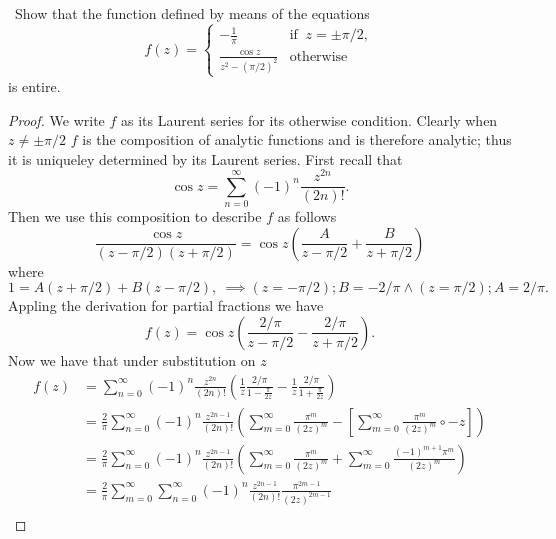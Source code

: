 \documentclass[11pt]{amsart}
\theoremstyle{definition}
\numberwithin{theorem}{section}
\numberwithin{definition}{section}
\numberwithin{equation}{section}
\begin{document}
\medskip {}\ Show that the function defined by means of the equations
\begin{equation*}	
	f(z) = \begin{cases}
		-\frac{1}{\pi} & \text{if }\ z = \pm \pi/2, \\
		\frac{\cos z}{z^2 - (\pi/2)^2} &\text{otherwise}
	\end{cases} 
\end{equation*}
is entire.
\begin{proof}
	We write $f$ as its Laurent series for its otherwise condition. Clearly when $z \neq \pm \pi/2$ $f$ is the composition of analytic functions and is therefore analytic; thus it is uniqueley determined by its Laurent series.
	First recall that
	\begin{equation*}
		\cos z = \sum_{n=0}^\infty (-1)^n \frac{z^{2n}}{(2n)!}.
	\end{equation*}
	Then we use this composition to describe $f$ as follows
	\begin{equation*}
		\frac{\cos z}{(z- \pi/2)(z+ \pi/2)} = \cos z \left(\frac{A}{z - \pi/2} +  \frac{B}{z+ \pi/2}\right)
	\end{equation*}
	where 
	\begin{equation*}
		1 = A(z + \pi/2) + B(z - \pi/2),\ \implies (z = -\pi/2); B = -2/\pi \wedge (z = \pi/2); A = 2/\pi.
	\end{equation*}
	Appling the derivation for partial fractions we have
	\begin{equation*}
		f(z) = \cos z \left(\frac{2/\pi}{z - \pi/2} - \frac{2/\pi}{z + \pi/2}\right).
	\end{equation*}
	Now  we have that under substitution on $z$
	\begin{equation*}
		\begin{aligned}
		f(z) &= \sum_{n=0}^\infty (-1)^n \frac{z^{2n}}{(2n)!} \left(\frac{1}{z}\frac{2/\pi}{1 - \frac{\pi}{2z}} - \frac{1}{z}\frac{2/\pi}{1 + \frac{\pi}{2z}}\right) \\
		&= \frac{2}{\pi}\sum_{n=0}^\infty (-1)^n \frac{z^{2n-1}}{(2n)!} \left(\sum_{m=0}^\infty \frac{\pi^m}{(2z)^m} - \left[\sum_{m=0}^\infty \frac{\pi^m}{(2z)^m} \circ -z \right]\right) \\
		&=\frac{2}{\pi}\sum_{n=0}^\infty (-1)^n \frac{z^{2n-1}}{(2n)!} \left(\sum_{m=0}^\infty \frac{\pi^m}{(2z)^m} + \sum_{m=0}^\infty \frac{(-1)^{m+1}\pi^m}{(2z)^m}\right) \\
		&=\frac{2}{\pi} \sum_{m=0}^\infty  \sum_{n=0}^\infty  (-1)^n \frac{z^{2n-1}}{(2n)!} \frac{\pi^{2m-1}}{(2z)^{2m-1}} \\

\end{aligned}
\end{equation*}
\end{proof}
\end{document}
